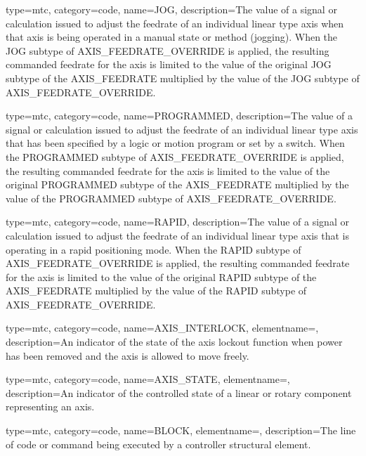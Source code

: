 {
  type=mtc,
  category=code,
  name={JOG},
  description={The value of a signal or calculation issued to adjust the feedrate of an individual linear type axis when that axis is being operated in a manual state or method (jogging).   \newline When the JOG subtype of AXIS\_FEEDRATE\_OVERRIDE is applied, the resulting commanded feedrate for the axis is limited to the value of the original JOG subtype of the AXIS\_FEEDRATE multiplied by the value of the JOG subtype of AXIS\_FEEDRATE\_OVERRIDE.}
}

{
  type=mtc,
  category=code,
  name={PROGRAMMED},
  description={The value of a signal or calculation issued to adjust the feedrate of an individual linear type axis that has been specified by a logic or motion program or set by a switch. \newline When the PROGRAMMED subtype of AXIS\_FEEDRATE\_OVERRIDE is applied, the resulting commanded feedrate for the axis is limited to the value of the original PROGRAMMED subtype of the AXIS\_FEEDRATE multiplied by the value of the PROGRAMMED subtype of AXIS\_FEEDRATE\_OVERRIDE.}
}

{
  type=mtc,
  category=code,
  name={RAPID},
  description={The value of a signal or calculation issued to adjust the feedrate of an individual linear type axis that is operating in a rapid positioning mode. \newline When the RAPID subtype of AXIS\_FEEDRATE\_OVERRIDE is applied, the resulting commanded feedrate for the axis is limited to the value of the original RAPID subtype of the AXIS\_FEEDRATE multiplied by the value of the RAPID subtype of AXIS\_FEEDRATE\_OVERRIDE.}
}

{
  type=mtc,
  category=code,
  name={AXIS\_INTERLOCK},
  elementname=,
  description={An indicator of the state of the axis lockout function when power has been removed and the axis is allowed to move freely.}
}

{
  type=mtc,
  category=code,
  name={AXIS\_STATE},
  elementname=,
  description={An indicator of the controlled state of a \gls{linear} or \gls{rotary} component representing an axis.}
}

{
  type=mtc,
  category=code,
  name={BLOCK},
  elementname=,
  description={The line of code or command being executed by a \gls{controller} \gls{structural element}.}
}

